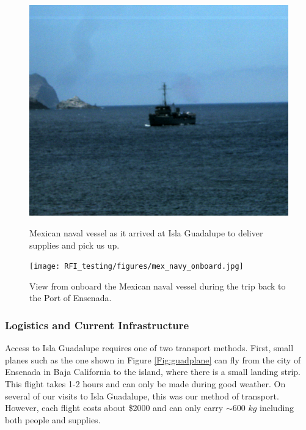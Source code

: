 \begin{figure}[htb]
\centering
\begin{minipage}[b]{0.43\textwidth}
\centering
\includegraphics[width=0.95\linewidth]{RFI_testing/figures/mex_navy_arrival.jpg}
\caption{Mexican naval vessel as it arrived at Isla Guadalupe to deliver supplies and pick us up.}
\label{Fig:guadboat}
\end{minipage}%
\begin{minipage}[b]{0.02\textwidth}
\hspace{1cm}
\end{minipage}%
\begin{minipage}[b]{0.51\textwidth}
\centering
\texttt{[image: RFI\_testing/figures/mex\_navy\_onboard.jpg]}
\caption{View from onboard the Mexican naval vessel during the trip back to the Port of Ensenada.}
\label{Fig:guadonboard}
\end{minipage}
\end{figure}

\subsubsection{Logistics and Current Infrastructure}

Access to Isla Guadalupe requires one of two transport methods. First, small planes such as the one shown in Figure \ref{Fig:guadplane} can fly from the city of Ensenada in Baja California to the island, where there is a small landing strip. This flight takes 1-2 hours and can only be made during good weather. On several of our visits to Isla Guadalupe, this was our method of transport. However, each flight costs about \$2000 and can only carry $\sim$600 $kg$ including both people and supplies. 

